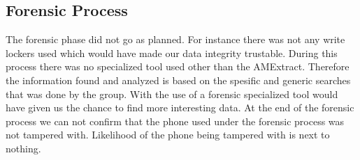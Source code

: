 \subsection{Forensic Process}
The forensic phase did not go as planned. For instance there was not any write lockers used which would have made our data integrity trustable. During this process there was no specialized tool used other than the AMExtract. Therefore the information found and analyzed is based on the spesific and generic searches that was done by the group. With the use of a forensic specialized tool would have given us the chance to find more interesting data. At the end of the forensic process we can not confirm that the phone used under the forensic process was not tampered with. Likelihood of the phone being tampered with is next to nothing.